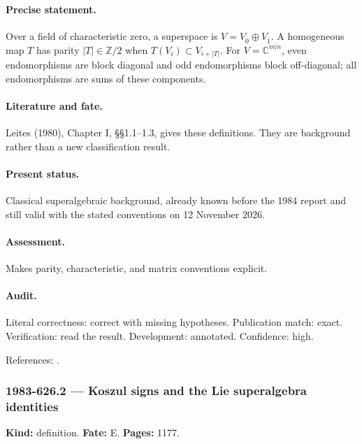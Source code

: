 \paragraph{Precise statement.} Over a field of characteristic zero, a superspace is \(V=V_{\overline0}\oplus V_{\overline1}\). A homogeneous map \(T\) has parity \(|T|\in\mathbb Z/2\) when \(T(V_i)\subset V_{i+|T|}\). For \(V=\mathbb C^{m|n}\), even endomorphisms are block diagonal and odd endomorphisms block off-diagonal; all endomorphisms are sums of these components.

\paragraph{Literature and fate.} Leites (1980), Chapter I, \S\S1.1–1.3, gives these definitions. They are background rather than a new classification result.

\paragraph{Present status.} Classical superalgebraic background, already known before the 1984 report and still valid with the stated conventions on 12 November 2026.

\paragraph{Assessment.} Makes parity, characteristic, and matrix conventions explicit.

\paragraph{Audit.} Literal correctness: correct with missing hypotheses. Publication match: exact. Verification: read the result. Development: annotated. Confidence: high.

\noindent References: \citep{leites1980introduction}.\par

\subsubsection{1983-626.2 --- Koszul signs and the Lie superalgebra identities}

\label{item:1983-626.2}

\noindent\textbf{Kind:} definition. \textbf{Fate:} E. \textbf{Pages:} 1177.\par


